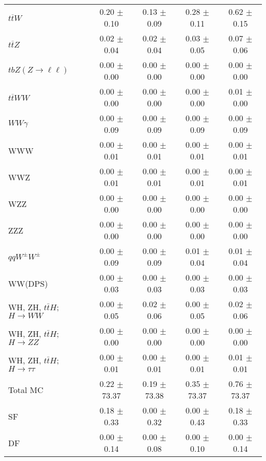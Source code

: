 \begin{tabular}{l|cccc}
                   $t\overline{t}W$ &  0.20 $\pm$  0.10 &  0.13 $\pm$  0.09 &  0.28 $\pm$  0.11 &  0.62 $\pm$  0.15 \\
                   $t\overline{t}Z$ &  0.02 $\pm$  0.04 &  0.02 $\pm$  0.04 &  0.03 $\pm$  0.05 &  0.07 $\pm$  0.06 \\
    $tbZ (Z \rightarrow \ell \ell)$ &  0.00 $\pm$  0.00 &  0.00 $\pm$  0.00 &  0.00 $\pm$  0.00 &  0.00 $\pm$  0.00 \\
                  $t\overline{t}WW$ &  0.00 $\pm$  0.00 &  0.00 $\pm$  0.00 &  0.00 $\pm$  0.00 &  0.01 $\pm$  0.00 \\
                         $WW\gamma$ &  0.00 $\pm$  0.09 &  0.00 $\pm$  0.09 &  0.00 $\pm$  0.09 &  0.00 $\pm$  0.09 \\
                                WWW &  0.00 $\pm$  0.01 &  0.00 $\pm$  0.01 &  0.00 $\pm$  0.01 &  0.00 $\pm$  0.01 \\
                                WWZ &  0.00 $\pm$  0.01 &  0.00 $\pm$  0.01 &  0.00 $\pm$  0.01 &  0.00 $\pm$  0.01 \\
                                WZZ &  0.00 $\pm$  0.00 &  0.00 $\pm$  0.00 &  0.00 $\pm$  0.00 &  0.00 $\pm$  0.00 \\
                                ZZZ &  0.00 $\pm$  0.00 &  0.00 $\pm$  0.00 &  0.00 $\pm$  0.00 &  0.00 $\pm$  0.00 \\
                 $qqW^{\pm}W^{\pm}$ &  0.00 $\pm$  0.09 &  0.00 $\pm$  0.09 &  0.01 $\pm$  0.04 &  0.01 $\pm$  0.04 \\
                            WW(DPS) &  0.00 $\pm$  0.03 &  0.00 $\pm$  0.03 &  0.00 $\pm$  0.03 &  0.00 $\pm$  0.03 \\
WH, ZH, $t\bar{t}H$; $H \rightarrow WW$ &  0.00 $\pm$  0.05 &  0.02 $\pm$  0.06 &  0.00 $\pm$  0.05 &  0.02 $\pm$  0.06 \\
WH, ZH, $t\bar{t}H$; $H \rightarrow ZZ$ &  0.00 $\pm$  0.00 &  0.00 $\pm$  0.00 &  0.00 $\pm$  0.00 &  0.00 $\pm$  0.00 \\
WH, ZH, $t\bar{t}H$; $H \rightarrow \tau\tau$ &  0.00 $\pm$  0.01 &  0.00 $\pm$  0.01 &  0.00 $\pm$  0.01 &  0.01 $\pm$  0.01 \\
\hline\hline
                           Total MC &  0.22 $\pm$ 73.37 &  0.19 $\pm$ 73.38 &  0.35 $\pm$ 73.37 &  0.76 $\pm$ 73.37 \\
\hline
                                 SF &  0.18 $\pm$  0.33 &  0.00 $\pm$  0.32 &  0.00 $\pm$  0.43 &  0.18 $\pm$  0.33 \\
                                 DF &  0.00 $\pm$  0.14 &  0.00 $\pm$  0.08 &  0.00 $\pm$  0.10 &  0.00 $\pm$  0.14 \\

\end{tabular}
